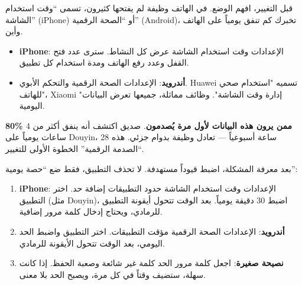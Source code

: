 


قبل التغيير، افهم الوضع. في الهاتف وظيفة لم يفتحها كثيرون، تسمى “وقت استخدام الشاشة” (iPhone) أو “الصحة الرقمية” (Android)، تخبرك كم تنفق يومياً على الهاتف وأين.

\begin{itemize}
  \item \textbf{iPhone}: الإعدادات وقت استخدام الشاشة عرض كل النشاط. سترى عدد فتح القفل وعدد رفع الهاتف ومدة استخدام كل تطبيق.
  \item \textbf{أندرويد}: الإعدادات الصحة الرقمية والتحكم الأبوي. Huawei تسميه "استخدام صحي للهاتف"، Xiaomi "إدارة وقت الشاشة". وظائف مماثلة، جميعها تعرض البيانات اليومية.
\end{itemize}

\textbf{80\% ممن يرون هذه البيانات لأول مرة يُصدمون}. صديق اكتشف أنه ينفق أكثر من 4 ساعات يومياً على Douyin، 28 ساعة أسبوعياً — تعادل وظيفة بدوام جزئي. هذه “الصدمة الرقمية” الخطوة الأولى للتغيير.


بعد معرفة المشكلة، اضبط قيوداً مستهدفة. لا تحذف التطبيق، فقط ضع “حصة يومية”:

\begin{enumerate}
  \item \textbf{iPhone}: الإعدادات وقت استخدام الشاشة حدود التطبيقات إضافة حد. اختر التطبيق (مثل Douyin)، اضبط 30 دقيقة يومياً. بعد الوقت تتحول أيقونة التطبيق للرمادي، ويحتاج إدخال كلمة مرور إضافية.
  \item \textbf{أندرويد}: الإعدادات الصحة الرقمية مؤقت التطبيقات. اختر التطبيق واضبط الحد اليومي، بعد الوقت تتحول الأيقونة للرمادي.
  \item \textbf{نصيحة صغيرة}: اجعل كلمة مرور الحد كلمة غير شائعة وصعبة الحفظ. إذا كانت سهلة، ستضيف وقتاً في كل مرة، ويصبح الحد بلا معنى.
\end{enumerate}


